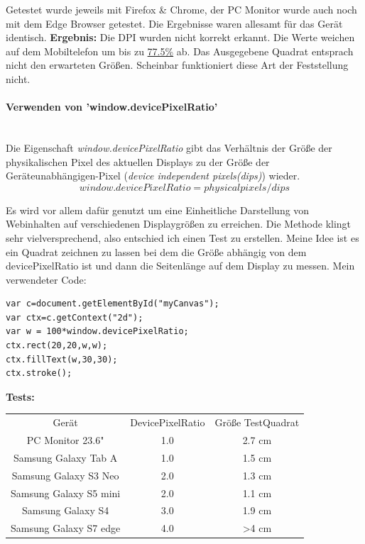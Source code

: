 	      \newline
	      \newline
	      Getestet wurde jeweils mit Firefox \& Chrome, der PC Monitor wurde auch noch mit dem Edge Browser getestet. Die Ergebnisse waren allesamt für das Gerät identisch.
	      \newline
	      \newline
	      \textbf{Ergebnis:} Die DPI wurden nicht korrekt erkannt. Die Werte weichen auf dem Mobiltelefon um bis zu \underline{77.5\%} ab.
	      \newline
	      Das Ausgegebene Quadrat entsprach nicht den erwarteten Größen.
	      Scheinbar funktioniert diese Art der Feststellung nicht.
\newpage
\paragraph{Verwenden von 'window.devicePixelRatio'}
\mbox{}\\
Die Eigenschaft \textit{window.devicePixelRatio} gibt das Verhältnis der Größe der physikalischen Pixel des aktuellen Displays zu der Größe der Geräteunabhängigen-Pixel (\textit{device independent pixels(dips)}) wieder.
\begin{displaymath}
	window.devicePixelRatio = physical pixels / dips 
\end{displaymath}

Es wird vor allem dafür genutzt um eine Einheitliche Darstellung von Webinhalten auf verschiedenen Displaygrößen zu erreichen.
\newline
Die Methode klingt sehr vielversprechend, also entschied ich einen Test zu erstellen. Meine Idee ist es ein Quadrat zeichnen zu lassen bei dem die Größe abhängig von dem devicePixelRatio ist und dann die Seitenlänge auf dem Display zu messen.
Mein verwendeter Code:
\begin{lstlisting}
var c=document.getElementById("myCanvas");
var ctx=c.getContext("2d");
var w = 100*window.devicePixelRatio;
ctx.rect(20,20,w,w);
ctx.fillText(w,30,30); 
ctx.stroke(); 
\end{lstlisting}

\textbf{Tests:}
\newline
\begin{tabular}{ccc}
	Gerät                  & DevicePixelRatio & Größe TestQuadrat   \\
	PC Monitor 23.6"       & 1.0              & 2.7 cm              \\
	Samsung Galaxy Tab A   & 1.0              & 1.5 cm              \\
	Samsung Galaxy S3 Neo  & 2.0              & 1.3 cm              \\
	Samsung Galaxy S5 mini & 2.0              & 1.1 cm              \\
	Samsung Galaxy S4      & 3.0              & 1.9 cm              \\
	Samsung Galaxy S7 edge & 4.0              & >4 cm               \\
\end{tabular}
